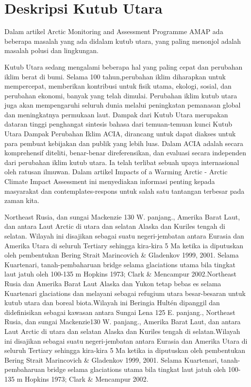 %

\section{Deskripsi Kutub Utara}	

		Dalam artikel Arctic Monitoring and Assessment Programme {AMAP}  ada beberapa masalah yang ada didalam 
	kutub utara, yang paling menonjol adalah masalah polusi dan lingkungan.
		
		Kutub Utara sedang mengalami beberapa hal yang paling cepat dan perubahan iklim berat di bumi. Selama 100 tahun,perubahan
	iklim diharapkan untuk mempercepat, memberikan kontribusi untuk fisik utama, ekologi, sosial, dan perubahan ekonomi, banyak yang 
	telah dimulai. Perubahan iklim kutub utara juga akan mempengaruhi seluruh dunia melalui peningkatan pemanasan global dan meningkatnya permukaan laut. 
	Dampak dari Kutub Utara merupakan dataran tinggi penghangat sintesis bahasa dari temuan-temuan kunci Kutub Utara Dampak Perubahan Iklim {ACIA}, dirancang 
	untuk dapat diakses untuk para pembuat kebijakan dan publik yang lebih luas. Dalam ACIA adalah secara komprehensif diteliti, benar-benar direferensikan,
	dan evaluasi secara independen dari perubahan iklim kutub utara. Ia telah terlibat sebuah upaya internasional oleh ratusan ilmuwan.
	Dalam artikel Impacts of a Warming Arctic - Arctic Climate Impact Assessment ini menyediakan informasi penting kepada masyarakat dan contemplates-respons 
	untuk salah satu tantangan terbesar pada zaman kita.
	
		Northeast Rusia, dan sungai Mackenzie {130 W. panjang.}, Amerika Barat Laut, dan antara Laut Arctic di utara dan selatan Alaska dan
	Kuriles tengah di selatan. Wilayah ini disajikan sebagai suatu negeri-jembatan antara Eurasia dan Amerika Utara di seluruh Tertiary sehingga kira-kira 5 Ma
	ketika ia diputuskan oleh pembentukan Bering Strait {Marincovich \& Gladenkov 1999, 2001}. Selama Kuartenari, tanah-pembaharuan bridge selama glaciations 
	utama bila tingkat laut jatuh oleh 100-135 m {Hopkins 1973; Clark \& Mencampur 2002}.Northeast Rusia dan Amerika Barat Laut {Alaska dan Yukon} tetap bebas es 
	selama Kuartenari glaciations dan melayani sebagai refugium utara besar-besaran untuk kutub utara dan boreal biota.Wilayah ini Beringia Hultén dipanggil dan
	didefinisikan sebagai kawasan antara Sungai Lena {125 E. panjang.}, Northeast Rusia, dan sungai Mackenzie{130 W. panjang.}, 
	Amerika Barat Laut, dan antara Laut Arctic di utara dan selatan Alaska dan Kuriles tengah di selatan.Wilayah ini disajikan sebagai suatu negeri-jembatan antara 
	Eurasia dan Amerika Utara di seluruh Tertiary sehingga kira-kira 5 Ma ketika ia diputuskan oleh pembentukan Bering Strait {Marincovich \& Gladenkov 1999, 2001}. 
	Selama Kuartenari, tanah-pembaharuan bridge selama glaciations utama bila tingkat laut jatuh oleh 100-135 m {Hopkins 1973; Clark \& Mencampur 2002}.
	
